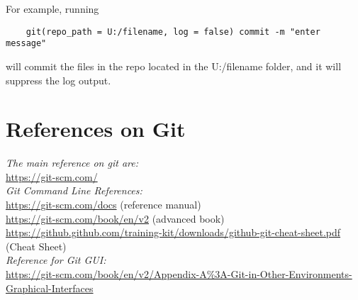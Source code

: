 \documentclass{article}
\begin{document}
For example, running
\begin{verbatim}
    git(repo_path = U:/filename, log = false) commit -m "enter message"
\end{verbatim}

will commit the files in the repo located in the U:/filename folder, and it will suppress the log output.

\section{References on Git}

 
 \emph{The main reference on git are:}
 \\ \indent  \url{https://git-scm.com/}  
 \\ \emph{Git Command Line References:}
 \\ \indent  \url{https://git-scm.com/docs}  (reference manual)
 \\ \indent  \url{https://git-scm.com/book/en/v2}  (advanced book)
 \\ \indent  \small{\url{https://github.github.com/training-kit/downloads/github-git-cheat-sheet.pdf}} (Cheat Sheet)
 \\\emph{Reference for Git GUI:}
 \\ \indent \small{ \url{https://git-scm.com/book/en/v2/Appendix-A%3A-Git-in-Other-Environments-Graphical-Interfaces}}
\end{document}
